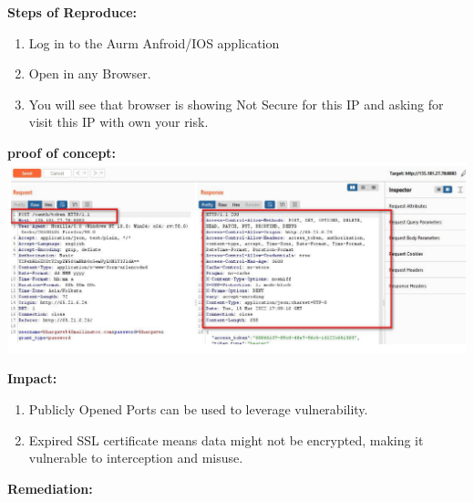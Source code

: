 \documentclass{article}
\begin{document}
\begin{description}[itemsep=2pt, leftmargin=0.2cm]
                    \item \large \textbf{Steps of Reproduce:}
                            \linespread{1.0}
                            \begin{enumerate}[leftmargin=0.5cm]
                             
                             \item \large Log in to the Aurm Anfroid/IOS application

                             \item \large Open in any Browser.

                             \item \large You will see that browser is showing Not Secure for this IP and asking for visit this IP with own your risk.
                             \end{enumerate}

                    \item \large \textbf{proof of concept: \\ \includegraphics[width=1.0\textwidth]{2.png}} 


                    

                    \item \large \textbf{Impact:}
                            \linespread{1.0}
                            \begin{enumerate}[leftmargin=0.5cm]
                             \item \large Publicly Opened Ports can be used to leverage vulnerability.
\item \large Expired SSL certificate means data might not be encrypted, making it vulnerable to interception and misuse. 
                            \end{enumerate}  
                            
                            
                    \item \large \textbf{Remediation:}
                            \linespread{1.0}
                            \begin{enumerate}[leftmargin=0.5cm]
                             

\end{enumerate}
\end{description}
\end{document}
